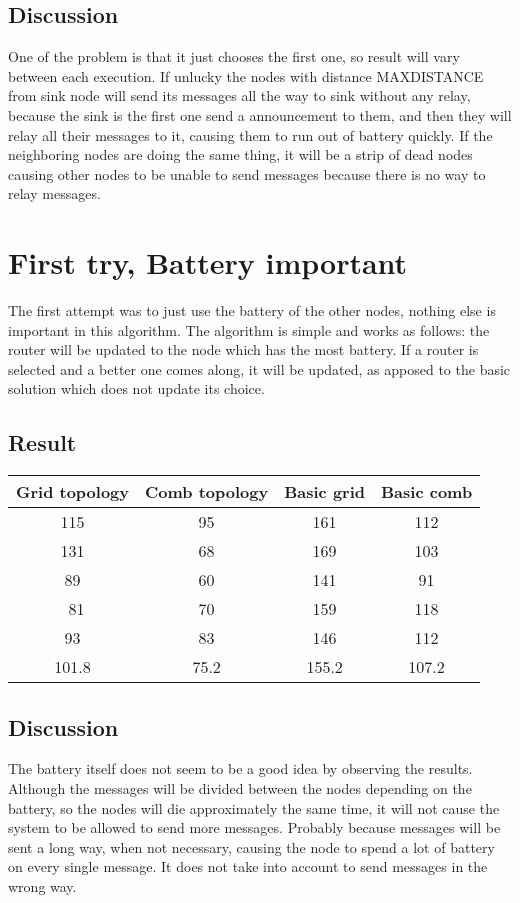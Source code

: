 \documentclass{article}
\begin{document}
  \subsection{Discussion}
   One of the problem is that it just chooses the first one,
   so result will vary between each execution.
   If unlucky the nodes with distance MAXDISTANCE from
   sink node will send its messages all the way to sink
   without any relay, because the sink is the first one
   send a announcement to them, and then they will relay
   all their messages to it, causing them to run out of
   battery quickly. If the neighboring nodes
   are doing the same thing, it will be a strip of dead
   nodes causing other nodes to be unable to send messages
   because there is no way to relay messages.

\section{First try, Battery important}
  The first attempt was to just use the battery of the other nodes, 
  nothing else is important in this algorithm. The algorithm is simple
  and works as follows: the router will be updated to the node which 
  has the most battery. If a router is selected and a better one
  comes along, it will be updated, as apposed to the basic solution
  which does not update its choice.
  
  \subsection{Result}
    \begin{tabular}{c|c||c|c}
      Grid topology & Comb topology & Basic grid & Basic comb\\
      \hline
      \hline
      115 & 95 & 161 & 112\\
      131 & 68 & 169 & 103\\
      89  & 60 & 141 & 91\\\
      81  & 70 & 159 & 118\\
      93  & 83 & 146 & 112\\
      \hline
      101.8&75.2&155.2&107.2\\

      
    \end{tabular}
  \subsection{Discussion}
   The battery itself does not seem to be a good idea by observing the results.
   Although the messages will be divided between the nodes depending on the battery,
   so the nodes will die approximately the same time, it will not cause the
   system to be allowed to send more messages. Probably because messages will be sent
   a long way, when not necessary, causing the node to spend a lot of battery on
   every single message.
   It does not take into account to send messages in the wrong way.
\end{document}
